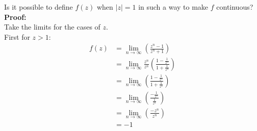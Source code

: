 \begin{enumerate}
	Is it possible to define $f(z)$ when $|z| = 1$ in such a way to make $f$ continuous? \\
		
	\textbf{Proof:} \\

	Take the limits for the cases of $z$.\\ 
	
	First for $z > 1$:
	\begin{align*}
		f(z) &= \lim_{n \to \infty} \left( \frac{z^n - 1}{z^n + 1} \right) \\
		&= \lim_{n \to \infty} \frac{z^n}{z^n} \left( \frac{1 - \frac{1}{z^n}}{1 + \frac{1}{z^n}} \right) \\
		&= \lim_{n \to \infty} \left( \frac{1 - \frac{1}{z^n}}{1 + \frac{1}{z^n}} \right) \\
		&= \lim_{n \to \infty} \left( \frac{- \frac{1}{z^n}}{\frac{1}{z^n}} \right) \\
		&= \lim_{n \to \infty} \left( \frac{- z^n}{{z^n}} \right) \\
		&= -1
	\end{align*}


\end{enumerate}
